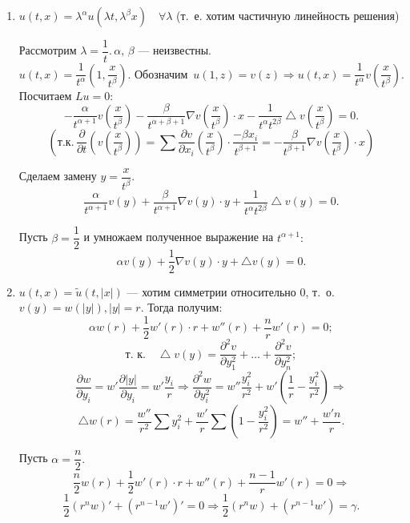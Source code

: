 \begin{enumerate}
\item $u(t,x) = \lambda^\alpha u(\lambda t, \lambda^\beta x) \quad \forall \lambda$ (т.~е. хотим частичную линейность решения)

Рассмотрим $\lambda = \dfrac{1} {t}. \, \alpha, \, \beta$ --- неизвестны.
$$u(t,x) = \dfrac{1}{t^\alpha}(1, \dfrac{x}{t^\beta}) \text{. Обозначим } \, u(1,z) = v(z) \Rightarrow u(t,x) = \dfrac{1}{t^\alpha} v(\dfrac{x}{t^\beta}).$$
Посчитаем $Lu = 0$:
$$-\dfrac{\alpha}{t^{\alpha + 1}} v\left( \dfrac{x}{t^\beta}\right) - \dfrac{\beta}{t^{\alpha + \beta + 1}}\nabla v\left( \dfrac{x}{t^\beta}\right)\cdot x - \dfrac{1}{t^\alpha t^{2\beta}}\bigtriangleup v\left( \dfrac{x}{t^\beta}\right) = 0.$$
$$\left(\text{т.к.} \, \dfrac{\partial}{\partial t} \left(v\left( \dfrac{x}{t^\beta}\right)\right) = \sum \dfrac{ \partial v}{\partial x_i}\left(\dfrac{x}{t^\beta}\right) \cdot \dfrac{-\beta x_i}{t^{\beta + 1}} = -\dfrac{\beta}{t^{\beta + 1}}\nabla v\left( \dfrac{x}{t^\beta}\right) \cdot x \right)$$

Сделаем замену $ y = \dfrac{x} {t^\beta}.$
$$ \dfrac{\alpha}{t^{\alpha + 1}} v(y) + \dfrac{\beta}{t^{\alpha + 1}} \nabla v(y) \cdot y + \dfrac{1}{t^\alpha  t^{2\beta}}\bigtriangleup v(y)=0.$$

Пусть $\beta = \dfrac{1}{2}$ и умножаем полученное выражение на $t^{\alpha + 1}:$
$$\alpha v(y) + \dfrac{1}{2} \nabla v(y) \cdot y + \bigtriangleup v(y) = 0.$$

\item $u(t,x) = \tilde{u}(t,|x|)$ --- хотим симметрии относительно 0, т.~о. $v(y) = w(|y|), |y| = r.$ Тогда получим:
$$ \alpha w(r) + \dfrac{1}{2} w'(r) \cdot r + w''(r) + \dfrac{n}{r}w'(r) = 0;$$
$$\text{т.~к.} \quad \bigtriangleup v(y) = \dfrac{\partial^2v}{\partial y_1^2} + \dots + \dfrac{\partial^2v}{\partial y_n^2};$$
$$\dfrac{\partial w}{\partial y_i} = w' \dfrac{\partial |y|}{\partial y_i} = w' \dfrac{y_i}{r} \Rightarrow 
\dfrac{\partial^2 w}{\partial y_i^2} = w''\dfrac{y_i^2}{r^2} + w'\left(\dfrac{1}{r} - \dfrac{y_i^2}{r^2}\right) \Rightarrow$$
$$\bigtriangleup w(r) = \dfrac{w''}{r^2}\sum y_i^2 + \dfrac{w'}{r}\sum (1 - \dfrac{y_i^2}{r^2}) = w'' + \dfrac{w'n}{r}.$$

Пусть $\alpha = \dfrac{n}{2}.$
$$\dfrac{n}{2}w(r) + \dfrac{1}{2}w'(r) \cdot r + w''(r) + \dfrac{n-1}{r}w'(r) = 0 \Rightarrow$$$$ \dfrac{1}{2}\left(r^nw\right)' + \left(r^{n-1}w'\right)' = 0 \Rightarrow \dfrac{1}{2}\left(r^nw\right)+ \left(r^{n-1}w'\right) = \gamma.$$


\end{enumerate}
